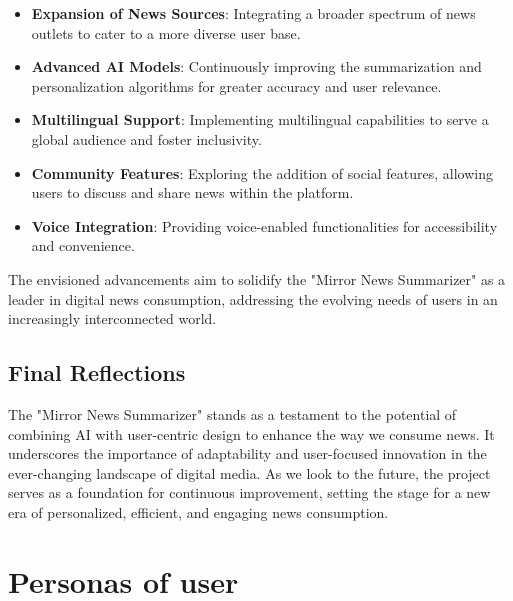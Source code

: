 \documentclass[10pt]{article}
\begin{document}
\begin{itemize}
    \item \textbf{Expansion of News Sources}: Integrating a broader spectrum of news outlets to cater to a more diverse user base.
    \item \textbf{Advanced AI Models}: Continuously improving the summarization and personalization algorithms for greater accuracy and user relevance.
    \item \textbf{Multilingual Support}: Implementing multilingual capabilities to serve a global audience and foster inclusivity.
    \item \textbf{Community Features}: Exploring the addition of social features, allowing users to discuss and share news within the platform.
    \item \textbf{Voice Integration}: Providing voice-enabled functionalities for accessibility and convenience.
\end{itemize}

The envisioned advancements aim to solidify the "Mirror News Summarizer" as a leader in digital news consumption, addressing the evolving needs of users in an increasingly interconnected world.

\subsection{Final Reflections}

The "Mirror News Summarizer" stands as a testament to the potential of combining AI with user-centric design to enhance the way we consume news. It underscores the importance of adaptability and user-focused innovation in the ever-changing landscape of digital media. As we look to the future, the project serves as a foundation for continuous improvement, setting the stage for a new era of personalized, efficient, and engaging news consumption.

\newpage

\printbibliography

\section*{Personas of user}
\end{document}
